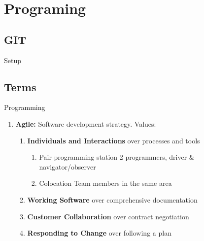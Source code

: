 \chapter{Programing}
\section{GIT}
	\begin{questions}{Setup}
		\begin{questionAnswer}
		\end{questionAnswer}
	\end{questions}

\section{Terms}
\begin{questions}{Programming}
	\begin{questionAnswer}
		\qItem{Agile}{See below \ref{sect:agile}}
	\end{questionAnswer}
	\begin{enumerate}
		\label{sect:agile}
		\item \textbf{Agile: } Software development strategy. Values:
			\begin{enumerate}
				\item \textbf{Individuals and Interactions} over processes and tools
					\begin{enumerate}
						\item Pair programming  station 2 programmers, driver \& navigator/observer
						\item Colocation \ra Team members in the same area
					\end{enumerate}
				\item \textbf{Working Software} over comprehensive documentation
				\item \textbf{Customer Collaboration} over contract negotiation
				\item \textbf{Responding to Change} over following a plan

			\end{enumerate}
	\end{enumerate}
\end{questions}


